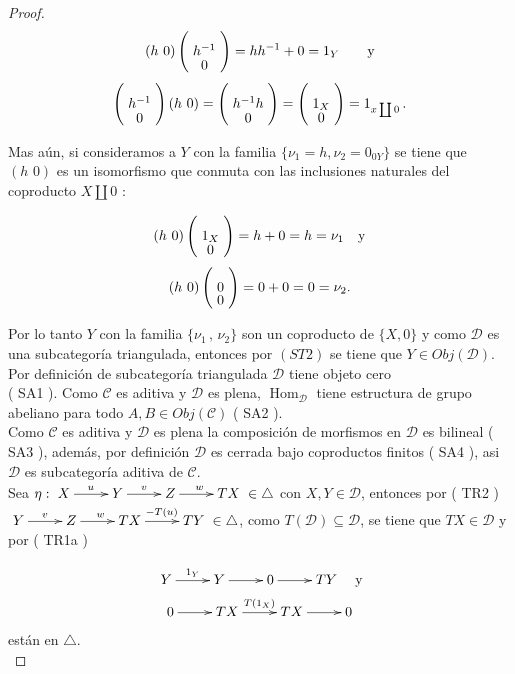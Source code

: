 \documentclass{article}
\begin{document}
\begin{enumerate}
\begin{proof}
\[(h\,\,0) \left(\xymatrix@R=-1mm{h^{-1}\\0}\right)=hh^{-1} +0=1_Y\qquad \text{y}\]
\[\left(\xymatrix@R=-1mm{h^{-1}\\0}\right) (h\,\,0)=\left(\xymatrix@R=-1mm{h^{-1}h\\0}\right)
=\left(\xymatrix@R=-1mm{1_X\\0}\right)=1_{x\coprod 0}\,.\]

Mas aún, si consideramos a $Y$ con la familia $\{\nu_1=h, \nu_2=0_{0Y}\}$ se tiene que $(h\,\,0)$ es un isomorfismo que conmuta con las 
inclusiones naturales del coproducto $X\coprod 0$ :

\[(h\,\,0) \left(\xymatrix@R=-1mm{1_X\\0}\right)=h+0=h=\nu_1\quad \text{y}\]
\[(h\,\,0) \left(\xymatrix@R=-1mm{0\\0}\right)=0+0=0=\nu_2.\]

Por lo tanto $Y$ con la familia $\{\nu_1\,,\,\nu_2\}$ son un coproducto de $\{X,0\}$ y como $\mathscr{D}$ es una subcategoría triangulada, entonces 
por $( ST2 )$ se tiene que $Y\in Obj(\mathscr{D})$.\\

 Por definición de subcategoría triangulada $\mathscr{D}$ tiene objeto cero \\( SA1 ). Como $\mathscr{C}$ es aditiva y $\mathscr{D}$ es 
plena, $\operatorname{Hom}_{\mathscr{D}}$ tiene estructura de grupo abeliano para todo $A,B\in Obj(\mathscr{C})$ ( SA2 ).\\

Como $\mathscr{C}$ es aditiva y $\mathscr{D}$ es plena la composición de morfismos en $\mathscr{D}$ es bilineal ( SA3 ), además, por definición
$\mathscr{D}$ es cerrada bajo coproductos finitos ( SA4 ), asi $\mathscr{D}$ es  subcategoría aditiva de $\mathscr{C}$.\\

 Sea $\eta: \xymatrix{X\ar[r]^u & Y\ar[r]^v & Z\ar[r]^w & TX } \in \triangle$ con $X,Y\in \mathscr{D}$, entonces por ( TR2 ) 
$\xymatrix{Y\ar[r]^v & Z\ar[r]^w & TX\ar[r]^{-T(u)} & TY} \in \triangle$, como $T(\mathscr{D})\subseteq \mathscr{D}$, se tiene que $TX\in 
\mathscr{D}$ y por ( TR1a ) 

\begin{gather*}
\xymatrix{Y\ar[r]^{1_Y}&Y\ar[r]&0\ar[r]&TY}\quad \text{y}\\
\xymatrix{0\ar[r]&TX\ar[r]^{T(1_{X})}&TX\ar[r]&0}
\end{gather*}
están en $\triangle$.\\


\end{proof}
\end{enumerate}
\end{document}
